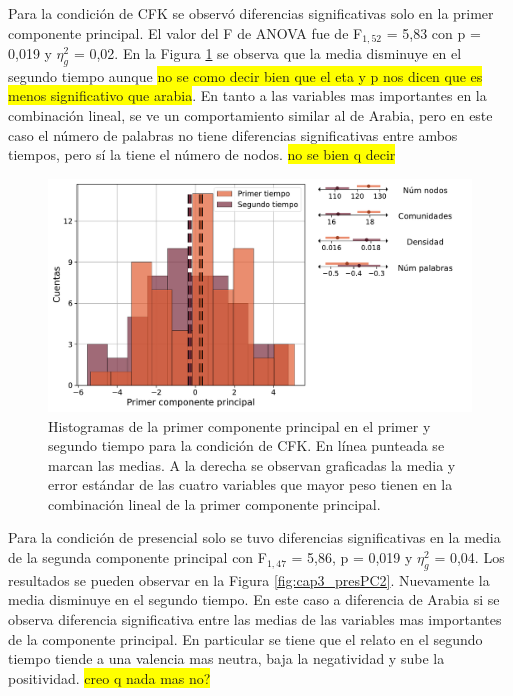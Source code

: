 Para la condición de CFK se observó diferencias significativas solo en la primer componente principal. El valor del F de ANOVA fue de F$_{1,52}$ = 5,83 con p = 0,019 y $\eta_g^2$ = 0,02. En la Figura \ref{fig:cap3_cfkPC1} se observa que la media disminuye en el segundo tiempo aunque \colorbox{yellow}{no se como decir bien que el eta y p nos dicen que es menos significativo que arabia}. En tanto a las variables mas importantes en la combinación lineal, se ve un comportamiento similar al de Arabia, pero en este caso el número de palabras no tiene diferencias significativas entre ambos tiempos, pero sí la tiene el número de nodos. \colorbox{yellow}{no se bien q decir}


\begin{figure}[h]
    \centering
    \includegraphics[width = 14cm]{figures/ch03/DosTiempos/cfk_PC1.pdf} 
    \caption{Histogramas de la primer componente principal en el primer y segundo tiempo para la condición de CFK. En línea punteada se marcan las medias. A la derecha se observan graficadas la media y error estándar de las cuatro variables que mayor peso tienen en la combinación lineal de la primer componente principal.}
\label{fig:cap3_cfkPC1}
\end{figure}

Para la condición de presencial solo se tuvo diferencias significativas en la media de la segunda componente principal con F$_{1,47}$ = 5,86, p = 0,019 y $\eta_g^2$ = 0,04. Los resultados se pueden observar en la Figura \ref{fig:cap3_presPC2}. Nuevamente la media disminuye en el segundo tiempo. En este caso a diferencia de Arabia si se observa diferencia significativa entre las medias de las variables mas importantes de la componente principal. En particular se tiene que el relato en el segundo tiempo tiende a una valencia mas neutra, baja la negatividad y sube la positividad. \colorbox{yellow}{creo q nada mas no?}

